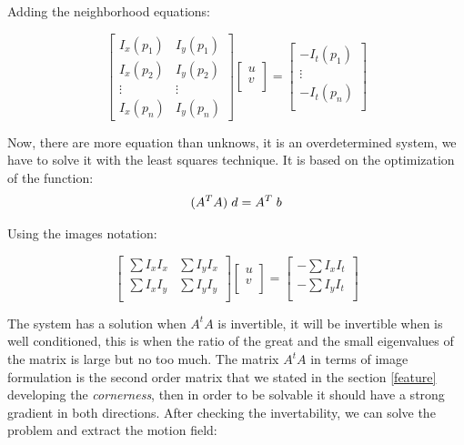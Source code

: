 \documentclass[12pt, a4paper, titlepage,twoside,openright]{article}
\begin{document}
Adding the neighborhood equations:


\[
\begin{bmatrix}
    I_{x}(p_{1}) & I_{y}(p_{1})  \\
    I_{x}(p_{2}) & I_{y}(p_{2})  \\
    \vdots & \vdots  \\
    I_{x}(p_{n}) & I_{y}(p_{n})
\end{bmatrix}
\begin{bmatrix}
    u \\
    v \\
\end{bmatrix}
=
\begin{bmatrix}
    -I_{t}(p_{1}) \\
    \vdots \\
    -I_{t}(p_{n}) \\
\end{bmatrix}
\]


Now, there are more equation than unknows, it is an overdetermined system, we have to solve it with the least squares technique. It is based on the optimization of the function:
$$(A^{T}A) \hspace{0.1cm} d=A^{T} \hspace{0.1cm} b$$

Using the images notation:


\[
\begin{bmatrix}
    \sum I_{x}I_{x} & \sum I_{y}I_{x}  \\
    \sum I_{x}I_{y} & \sum I_{y}I_{y}   \\
\end{bmatrix}
\begin{bmatrix}
    u \\
    v \\
\end{bmatrix}
=
\begin{bmatrix}
    - \sum I_{x}I_{t} \\
    - \sum I_{y}I_{t} \\
\end{bmatrix}
\]



The system has a solution when $A^{t}A$ is invertible, it will be invertible when is well conditioned, this is when the ratio of the great and the small eigenvalues of the matrix is large but no too much. The matrix $A^{t}A$ in terms of image formulation is the second order matrix that we stated in the section \ref{feature} developing the \textit{cornerness}, then in order to be solvable it should have a strong gradient in both directions. After checking the invertability, we can solve the problem and extract the motion field:
\end{document}
